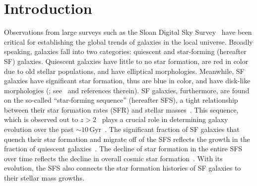 \documentclass[12pt, letterpaper, preprint, tighten]{aastex62}
\begin{document}
\section{Introduction}
Observations from large surveys such as the Sloan Digital Sky Survey~\citep[SDSS;][]{york2000}
have been critical for establishing the global trends of galaxies in
the local universe. Broadly speaking, galaxies fall into two categories:
quiescent and star-forming (hereafter SF) galaxies. Quiescent galaxies
have little to no star formation, are red in color due to old stellar populations,
and have elliptical morphologies. Meanwhile, SF galaxies have significant star 
formation, thus are blue in color, and have disk-like morphologies 
(\citealt{kauffmann2003, blanton2003, baldry2006, taylor2009, moustakas2013}; 
see~\citealt{blanton2009} and references therein). SF galaxies, furthermore, are 
found on the so-called ``star-forming sequence'' (hereafter SFS), a tight 
relationship between their star formation rates (SFR) and stellar 
masses~\citep[][see also Figure~\ref{fig:groupcat}]{noeske2007, daddi2007, salim2007, speagle2014, lee2015}.
This sequence, which is observed out to $z > 2$~\citep{wang2013, leja2015}
plays a crucial role in determining galaxy evolution over the past 
${\sim}10\,\mathrm{Gyr}$~\citep[see][for an alternative point of view]{kelson2014,abramson2016}.
The significant fraction of SF galaxies that quench their
star formation and migrate off of the SFS reflects the growth in the
fraction of quiescent galaxies~\citep{blanton2006, borch2006, bundy2006, moustakas2013}.
The decline of star formation in the entire SFS~\citep{lee2015, schreiber2015}
over time reflects the decline in overall cosmic star formation~\citep{hopkins2006, behroozi2013, madau2014}.
With its evolution, the SFS also connects the star formation histories of SF
galaxies to their stellar mass growths.
\end{document}
